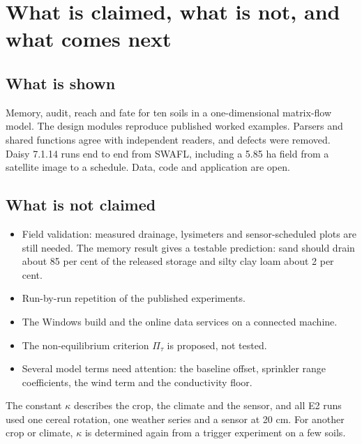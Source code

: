 \chapter{What is claimed, what is not, and what comes next}
\section{What is shown}
Memory, audit, reach and fate for ten soils in a one-dimensional matrix-flow model. The design modules reproduce published worked examples. Parsers and shared functions agree with independent readers, and defects were removed. Daisy 7.1.14 runs end to end from SWAFL, including a 5.85 ha field from a satellite image to a schedule. Data, code and application are open.

\section{What is not claimed}
\begin{itemize}[leftmargin=*]
\item Field validation: measured drainage, lysimeters and sensor-scheduled plots are still needed. The memory result gives a testable prediction: sand should drain about 85 per cent of the released storage and silty clay loam about 2 per cent.
\item Run-by-run repetition of the published experiments.
\item The Windows build and the online data services on a connected machine.
\item The non-equilibrium criterion $\Pi_\tau$ is proposed, not tested.
\item Several model terms need attention: the baseline offset, sprinkler range coefficients, the wind term and the conductivity floor.
\end{itemize}
The constant $\kappa$ describes the crop, the climate and the sensor, and all E2 runs used one cereal rotation, one weather series and a sensor at 20 cm. For another crop or climate, $\kappa$ is determined again from a trigger experiment on a few soils.

